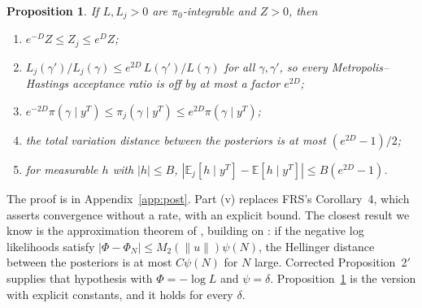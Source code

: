 \documentclass[11pt]{article}
\newtheorem{proposition}[theorem]{Proposition}
\theoremstyle{definition}
\theoremstyle{remark}
\begin{document}
\begin{proposition}\label{prop:post}
If $L, L_j > 0$ are $\pi_0$-integrable and $Z > 0$, then
\begin{enumerate}[label=(\roman*),leftmargin=2em]
\item $e^{-D}Z \le Z_j \le e^{D}Z$;
\item $L_j(\gamma')/L_j(\gamma) \le e^{2D}\,L(\gamma')/L(\gamma)$ for all $\gamma, \gamma'$, so
every Metropolis--Hastings acceptance ratio is off by at most a factor $e^{2D}$;
\item $e^{-2D}\pi(\gamma\mid y^T) \le \pi_j(\gamma\mid y^T) \le e^{2D}\pi(\gamma\mid y^T)$;
\item the total variation distance between the posteriors is at most $(e^{2D}-1)/2$;
\item for measurable $h$ with $|h| \le B$,
$|\mathbb{E}_j[h\mid y^T] - \mathbb{E}[h\mid y^T]| \le B(e^{2D} - 1)$.
\end{enumerate}
\end{proposition}

\noindent The proof is in Appendix~\ref{app:post}. Part (v) replaces FRS's Corollary~4, which
asserts convergence without a rate, with an explicit bound. The closest result we know is the
approximation theorem of \citet[Theorem 4.9 in the arXiv version]{DashtiStuart2017}, building on
\citet{CotterDashtiStuart2010}: if the negative log likelihoods satisfy
$|\Phi - \Phi_N| \le M_2(\|u\|)\psi(N)$, the Hellinger distance between the posteriors is at most
$C\psi(N)$ for $N$ large. Corrected Proposition~2$'$ supplies that hypothesis with
$\Phi = -\log L$ and $\psi = \delta$. Proposition~\ref{prop:post} is the version with explicit
constants, and it holds for every $\delta$.
\end{document}
